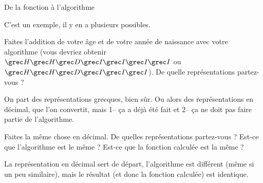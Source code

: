 \begin{exercice}
\begin{exercicelet}{De la fonction à l'algorithme}
\begin{questions}
\begin{xcorrection}
        C'est un exemple, il y en a plusieurs possibles.\end{xcorrection}
    \item Faites l'addition de votre âge et de votre année de naissance
      avec votre algorithme (vous devriez obtenir
      $\Eta\Eta\Delta\Iota\Iota\Iota\Iota$ ou $\Eta\Eta\Delta\Iota\Iota\Iota$). De
      quelle représentations partez-vous ?
      \begin{correction}On part des représentations grecques, bien
        sûr. Ou alors des représentations en décimal, que l'on
        convertit, mais 1-- ça a déjà été fait et 2-- ça ne doit pas
        faire partie de l'algorithme.\end{correction}
    \item Faites la même chose en décimal. De quelles représentations
      partez-vous ? Est-ce que l'algorithme est le même ? Est-ce que
      la fonction calculée est la même ?
      \begin{xcorrection} La représentation en décimal sert de départ,
        l'algorithme est différent (même si un peu similaire), mais le résultat
        (et donc la fonction calculée) est identique.
      \end{xcorrection}
    \end{questions}
  \end{exercicelet}
\end{exercice}
